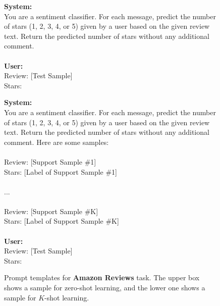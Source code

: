 \documentclass[11pt]{article}
\theoremstyle{definition}
\begin{document}
\begin{figure*} [htb]
    \centering
    \begin{mdframed}
    \small
    \textbf{System:} \\
    You are a sentiment classifier. For each message, predict the number of stars (1, 2, 3, 4, or 5) given by a user based on the given review text. Return the predicted number of stars without any additional comment. \\
    \\
    \textbf{User:} \\
    Review: [Test Sample] \\
    Stars: 
    
    \end{mdframed}
    \begin{mdframed}
    \small
    \textbf{System:} \\
    You are a sentiment classifier. For each message, predict the number of stars (1, 2, 3, 4, or 5) given by a user based on the given review text. Return the predicted number of stars without any additional comment. Here are some samples: \\
    \\
    Review: [Support Sample \#1] \\
    Stars: [Label of Support Sample \#1] \\
    \\
    ... \\
    \\
    Review: [Support Sample \#K] \\
    Stars: [Label of Support Sample \#K] \\
    \\
    \textbf{User:} \\
    Review: [Test Sample] \\
    Stars:     
    \end{mdframed}
	\caption{Prompt templates for {\bf Amazon Reviews} task. The upper box shows a sample for zero-shot learning, and the lower one shows a sample for $K$-shot learning.}
	\label{fig:icl-template-amazon}
\end{figure*}
\end{document}

